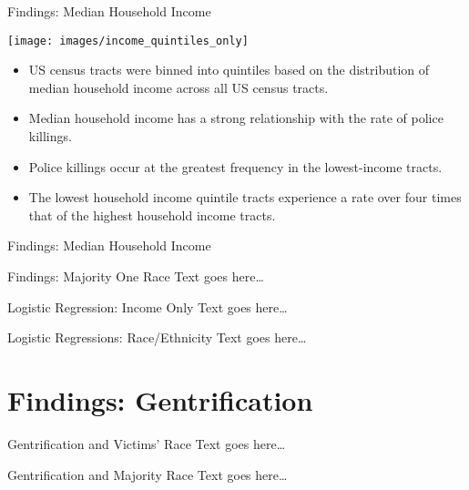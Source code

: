 \documentclass{beamer}
\begin{document}
\begin{frame}{Findings: Median Household Income}
	\begin{center}
	\texttt{[image: images/income\_quintiles\_only]}
	\end{center}
	
	\vspace*{24pt}
	
	\begin{itemize}
	\item US census tracts were binned into quintiles based on the distribution of median household income across all US census tracts. 
	\item Median household income has a strong relationship with the rate of police killings. 
	\item Police killings occur at the greatest frequency in the lowest-income tracts. 
	\item The lowest household income quintile tracts experience a rate over four times that of the highest household income tracts.
	\end{itemize}
\end{frame}

\begin{frame}{Findings: Median Household Income}
	
\end{frame}


\begin{frame}{Findings: Majority One Race}
	Text goes here\ldots
\end{frame}

\begin{frame}{Logistic Regression: Income Only}
	Text goes here\ldots
\end{frame}

\begin{frame}{Logistic Regressions: Race/Ethnicity}
	Text goes here\ldots
\end{frame}

\section{Findings: Gentrification}
\begin{frame}{Gentrification and Victims’ Race}
	Text goes here\ldots
\end{frame}

\begin{frame}{Gentrification and Majority Race}
	Text goes here\ldots
\end{frame}
\end{document}
